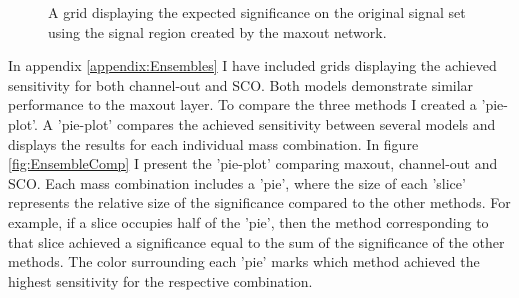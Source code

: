\begin{figure}
    \caption{A grid displaying the expected significance on the original signal set using the signal region 
    created by the maxout network.}
    \label{fig:MaxOutGridSig}
\end{figure}
In appendix \ref{appendix:Ensembles} I have included grids displaying the achieved sensitivity for both channel-out and \ac{SCO}. Both 
models demonstrate similar performance to the maxout layer. To compare the three methods I created a 'pie-plot'. A 'pie-plot' 
compares the achieved sensitivity between several models and displays the results for each individual mass combination.  In figure 
\ref{fig:EnsembleComp} I present the 'pie-plot' comparing maxout, channel-out and \ac{SCO}. Each mass combination includes a 'pie', where 
the size of each 'slice' represents the relative size of the significance compared to the other methods. For example, if a slice occupies 
half of the 'pie', then the method corresponding to that slice achieved a significance equal to the sum of the significance of the other methods.
The color surrounding each 'pie' marks which method achieved the highest sensitivity for the respective combination.
\\
